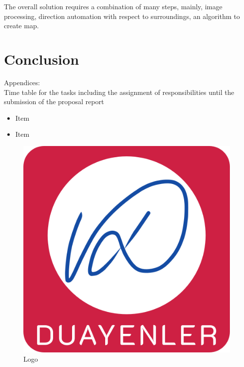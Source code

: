 \documentclass[a4paper,12pt]{article}
\begin{document}
The overall solution requires a combination of many steps, mainly, image processing, direction automation with respect to surroundings, an algorithm to create map.


\section{Conclusion}
Appendices:\\

Time table for the tasks including the assignment of responsibilities until the submission of the proposal report


\appendix









\begin{itemize}
	\item Item
	\item Item
\end{itemize}


\begin{figure}[H]
\centering
\setlength{\unitlength}{\textwidth} 
\includegraphics[width=0.7\unitlength]{images/logo1}
\caption{\label{fig:logo}Logo }
\end{figure}
\end{document}
